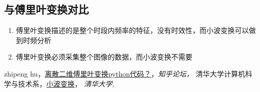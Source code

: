 \documentclass{article}
\begin{document}
        \subsection{与傅里叶变换对比}
        \begin{enumerate}
          \item 傅里叶变换描述的是整个时段内频率的特征，没有时效性，而小波变换可以做到时频分析
          \item 傅里叶变换必须采集整个图像的数据，而小波变换不需要
        \end{enumerate}
    \clearpage
       \begin{thebibliography}{90}
       {
       \bibitem{} zhipeng hu，\href{https://www.zhihu.com/question/27358117}{离散二维傅里叶变换python代码？}，{\it 知乎论坛，}
       \bibitem{} 清华大学计算机科学与技术系，\href{http://media.cs.tsinghua.edu.cn/~ahz/digitalimageprocess/chapter12/chapt12_ahz.htm}{小波变换}， {\it 清华大学, } }
       \end{thebibliography}
\end{document}
